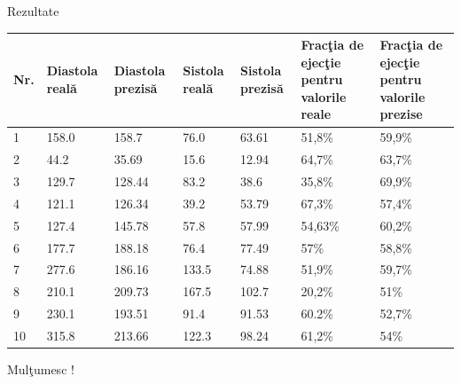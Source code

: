 \documentclass[xcolor=svgnames,handout]{beamer}
\begin{document}
    \begin{frame}
  {Rezultate}
  
    \begin{center}
 \begin{tabular}{|p{0.3cm}|p{1.1cm}|p{1.1cm}|p{1.1cm}|p{1.1cm}|p{2cm}|p{2cm}|} 
 \hline
 Nr. & Diastola real\u{a} & Diastola prezis\u{a} & Sistola real\u{a} & Sistola prezis\u{a} & Frac\c{t}ia de ejec\c{t}ie pentru valorile reale & Frac\c{t}ia de ejec\c{t}ie pentru valorile prezise  \\ [0.5ex] 
 \hline\hline
 1 &  158.0 & 158.7 & 76.0 & 63.61 & 51,8\% & 59,9\% \\
 \hline
 2 &  44.2 & 35.69 & 15.6 & 12.94 & 64,7\% & 63,7\% \\ 
 \hline
 3 &  129.7 & 128.44 & 83.2 & 38.6 & 35,8\% & 69,9\% \\
 \hline
 4 &  121.1 & 126.34 & 39.2 & 53.79 & 67,3\% & 57,4\% \\
 \hline
 5 &  127.4 & 145.78 & 57.8 & 57.99 & 54,63\% & 60,2\% \\
 \hline
 6 &  177.7 & 188.18 & 76.4 & 77.49 & 57\% & 58,8\% \\
 \hline
 7 &  277.6 & 186.16 & 133.5 & 74.88 & 51,9\% & 59,7\% \\
 \hline
 8 &  210.1 & 209.73 & 167.5 & 102.7 & 20,2\% & 51\% \\
 \hline
 9 &  230.1 & 193.51 & 91.4 & 91.53 & 60.2\% & 52,7\% \\
 \hline
 10 &  315.8 & 213.66 & 122.3 & 98.24 & 61,2\% & 54\% \\
 \hline
\end{tabular}
\end{center}
  
  \end{frame}
  
  
  \begin{frame}
  
  \begin{center}
\Huge Mul\c{t}umesc !
\end{center}
  
    
    
\end{frame}
    
\end{document}

